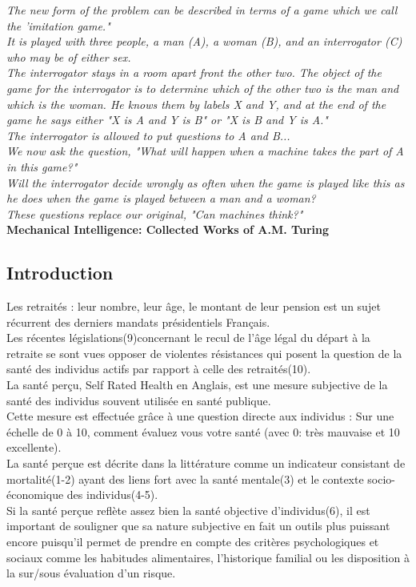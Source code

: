 \documentclass{book}
\begin{document}
\bigskip
\begin{flushright}
\textit{The new form of the problem can be described in terms of a game which we call the 'imitation game."\\
It is played with three people, a man (A), a woman (B), and an interrogator (C) who may be of either sex.\\
The interrogator stays in a room apart front the other two. The object of the game for the interrogator is to determine which of the other two is the man and which is the woman. He knows them by labels X and Y, and at the end of the game he says either "X is A and Y is B" or "X is B and Y is A."\\
The interrogator is allowed to put questions to A and B...\\
We now ask the question, "What will happen when a machine takes the part of A in this game?"\\
Will the interrogator decide wrongly as often when the game is played like this as he does when the game is played between a man and a woman?\\
These questions replace our original, "Can machines think?"}\\
\textbf{Mechanical Intelligence: Collected Works of A.M. Turing}
\end{flushright}


\mainmatter


\newpage
\begin{center}
\section*{Introduction}
\end{center}
Les retraités : leur nombre, leur âge, le montant de leur pension est un sujet récurrent des derniers mandats présidentiels Français.\\
Les récentes législations(9)concernant le recul de l'âge légal du départ à la retraite se sont vues opposer de violentes résistances qui posent la question de la santé des individus actifs par rapport à celle des retraités(10).\\

La santé perçu, Self Rated Health en Anglais, est une mesure subjective de la santé des individus souvent utilisée en santé publique.\\
Cette mesure est effectuée grâce à une question directe aux individus : Sur une échelle de 0 à 10, comment évaluez vous votre santé (avec 0: très mauvaise et 10 excellente).\\
La santé perçue est décrite dans la littérature comme un indicateur consistant de mortalité(1-2) ayant des liens fort avec la santé mentale(3) et le contexte socio-économique des individus(4-5).\\
Si la santé perçue reflète assez bien la santé objective d'individus(6), il est important de souligner que sa nature subjective en fait un outils plus puissant encore puisqu'il permet de prendre en compte des critères psychologiques et sociaux comme les habitudes alimentaires, l'historique familial ou les disposition à la sur/sous évaluation d'un risque.\\
\end{document}
